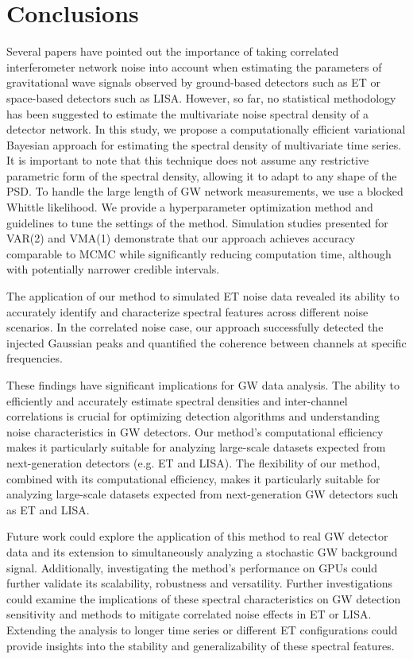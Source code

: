 \documentclass[%
 reprint,
 amsmath,amssymb,
 aps,
 nofootinbib,
]{revtex4-2}
\begin{document}
\section{Conclusions}
\label{sec:Discussion}
Several papers have pointed out the importance of taking correlated interferometer network noise into account when estimating the parameters of gravitational wave signals observed by ground-based detectors such as ET or space-based detectors such as LISA. However, so far, no statistical methodology has been suggested to estimate the multivariate noise spectral density of a detector network.
In this study, we propose a computationally efficient variational Bayesian approach for estimating the spectral density of multivariate time series. It is important to note that this technique does not assume any restrictive parametric form of the spectral density, allowing it to adapt to any shape of the PSD.
To handle the large length of GW network measurements, we use a blocked Whittle likelihood. 
We provide a hyperparameter optimization method and guidelines to tune the settings of the method. 
Simulation studies presented for VAR(2) and VMA(1) demonstrate that our approach achieves accuracy comparable to MCMC while significantly reducing computation time, although with potentially narrower credible intervals.

The application of our method to simulated ET noise data revealed its ability to accurately identify and characterize spectral features across different noise scenarios.
In the correlated noise case, our approach successfully detected the injected Gaussian peaks and quantified the coherence between channels at specific frequencies. 


These findings have significant implications for GW data analysis. The ability to efficiently and accurately estimate spectral densities and inter-channel correlations is crucial for optimizing detection algorithms and understanding noise characteristics in GW detectors. Our method's computational efficiency makes it particularly suitable for analyzing large-scale datasets expected from next-generation detectors (e.g. ET and LISA). The flexibility of our method, combined with its computational efficiency, makes it particularly suitable for analyzing large-scale datasets expected from next-generation GW detectors such as ET and LISA.

Future work could explore the application of this method to real GW detector data and its extension to simultaneously analyzing a stochastic GW background signal. 
Additionally, investigating the method's performance on GPUs could further validate its scalability, robustness and versatility.
Further investigations could examine the implications of these spectral characteristics on GW detection sensitivity and methods to mitigate correlated noise effects in ET or LISA. Extending the analysis to longer time series or different ET configurations could provide insights into the stability and generalizability of these spectral features.
\end{document}
